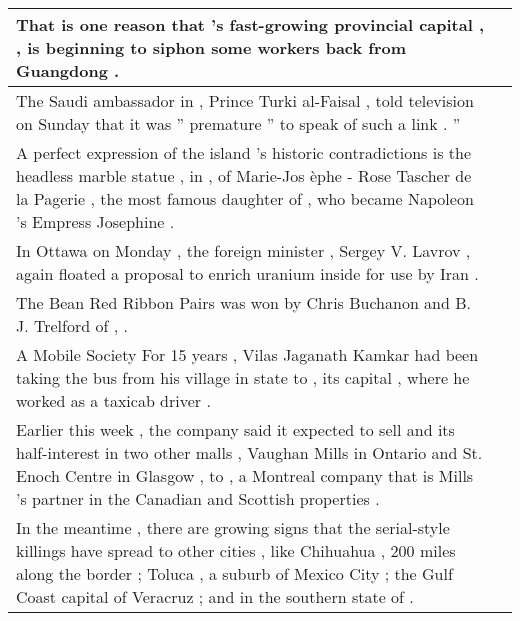 \begin{table}
\begin{tabular}{p{} P{1,3cm} }
\hline
{} {That is one reason that \underline{} 's fast-growing provincial capital , \underline{} , is beginning to siphon some workers back from Guangdong .} &    \\ 
\hline
{} {The Saudi ambassador in \underline{} , Prince Turki al-Faisal , told \underline{} television on Sunday that it was '' premature '' to speak of such a link . ''} &    \\ 
\hline
{} {A perfect expression of the island 's historic contradictions is the headless marble statue , in \underline{} , of Marie-Jos èphe - Rose Tascher de la Pagerie , the most famous daughter of \underline{} , who became Napoleon 's Empress Josephine .} &    \\ 
\hline
{} {In Ottawa on Monday , the \underline{} foreign minister , Sergey V. Lavrov , again floated a proposal to enrich uranium inside \underline{} for use by Iran .} &    \\ 
\hline
{} {The Bean Red Ribbon Pairs was won by Chris Buchanon and B. J. Trelford of \underline{} , \underline{} .} &    \\ 
\hline
{} {A Mobile Society For 15 years , Vilas Jaganath Kamkar had been taking the bus from his village in \underline{} state to \underline{} , its capital , where he worked as a taxicab driver .} &    \\ 
\hline
{} {Earlier this week , the company said it expected to sell \underline{} and its half-interest in two other malls , Vaughan Mills in Ontario and St. Enoch Centre in Glasgow , to \underline{} , a Montreal company that is Mills 's partner in the Canadian and Scottish properties .} &    \\ 
\hline
{} {In the meantime , there are growing signs that the serial-style killings have spread to other cities , like Chihuahua , 200 miles along the border ; Toluca , a suburb of Mexico City ; the Gulf Coast capital of Veracruz ; and \underline{} in the southern state of \underline{} .} &    \\ 

\end{tabular}
\end{table}

